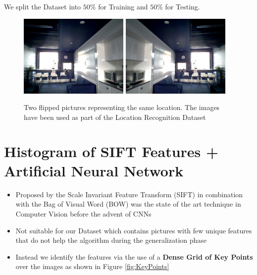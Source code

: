 \documentclass[a0, portrait]{IWIposter}
\begin{document}
\begin{multicols}{3}
\begin{itemize}
We split the Dataset into $50\%$ for Training and $50\%$ for Testing.
\end{itemize}

\begin{figure}
        \includegraphics[width=0.475\textwidth]{Position1.png}
        \hfill
        \includegraphics[width=0.475\textwidth]{Position2.png}
	\caption{Two flipped pictures representing the same location. The images have been used as part of the Location Recognition Dataset}
	\label{fig:FlippedExamples}
\end{figure}


\section*{Histogram of SIFT Features + Artificial Neural Network}
\begin{itemize}
	\item Proposed by \cite{lowe2004distinctive} the Scale Invariant Feature Transform (SIFT) in combination with the Bag of Visual Word (BOW) was the state of the art technique in Computer Vision before the advent of CNNs
	\item Not suitable for our Dataset which contains pictures with few unique features that do not help the algorithm during the generalization phase
	\item Instead we identify the features via the use of a \textbf{Dense Grid of Key Points} over the images
	as shown in Figure \ref{fig:KeyPoints}


\end{itemize}
\end{multicols}
\end{document}
